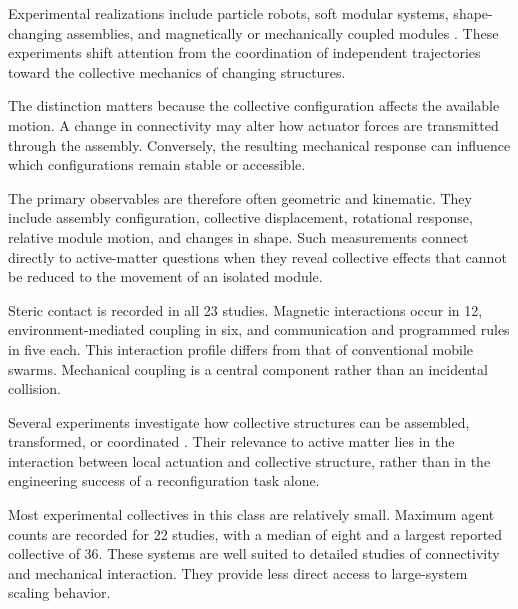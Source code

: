 Experimental realizations include
particle robots, soft modular
systems, shape-changing assemblies,
and magnetically or mechanically
coupled modules
\cite{Li2019particleroboticsba,Yang2024selfamputatingand,Hu2026diatominspired1di,Ma2024smarticle20desig,Yi2025reconfigurablerobot,Rogowski2026coordinatedselfass,Zhao2024snailinspiredrobot,Zhang2026anisotropicshapesh,Bhattacharjee2026collectiveassembly,Oliveri2021continuouslearning,Drew2021acousticcommunicati}.
These experiments shift attention
from the coordination of independent
trajectories toward the collective
mechanics of changing structures.

The distinction matters because
the collective configuration
affects the available motion.
A change in connectivity may
alter how actuator forces are
transmitted through the assembly.
Conversely, the resulting
mechanical response can influence
which configurations remain
stable or accessible.

The primary observables are
therefore often geometric and
kinematic. They include assembly
configuration, collective
displacement, rotational response,
relative module motion, and
changes in shape. Such
measurements connect directly
to active-matter questions
when they reveal collective
effects that cannot be reduced
to the movement of an isolated
module.

Steric contact is recorded
in all 23 studies. Magnetic
interactions occur in 12,
environment-mediated coupling
in six, and communication
and programmed rules in
five each. This interaction
profile differs from that
of conventional mobile swarms.
Mechanical coupling is a
central component rather
than an incidental collision.

Several experiments investigate
how collective structures can
be assembled, transformed,
or coordinated
\cite{Kaeser2025individualandcolle,Smith2025loopymovementseme,Rogowski2020magneticallyprogram,Ding2025transformablemodula,Ceron2021softroboticoscilla,Zhao2022softlatticemodules,Wang2026oscillatingeelrobo,Miyashita2008howmorphologyaffec,Paulos2015automatedselfassem,Bhattacharjee2026closedloopselfass,Ma2026crosslinkcollectiv,ICHIKAWA2004emergentbehaviorso}.
Their relevance to active matter
lies in the interaction between
local actuation and collective
structure, rather than in
the engineering success of
a reconfiguration task alone.

Most experimental collectives
in this class are relatively
small. Maximum agent counts
are recorded for 22 studies,
with a median of eight
and a largest reported
collective of 36.
These systems are well suited
to detailed studies of
connectivity and mechanical
interaction. They provide
less direct access to
large-system scaling behavior.

